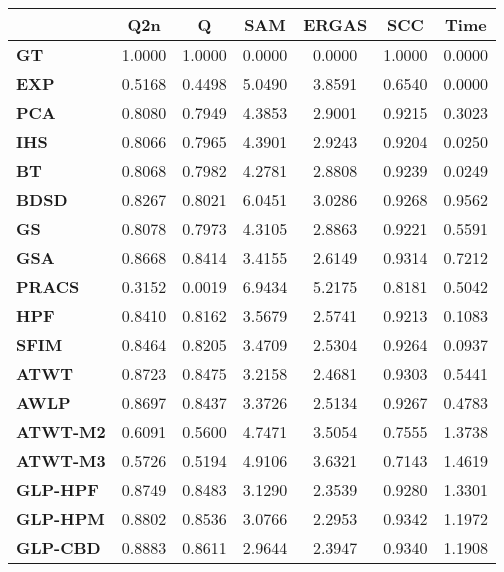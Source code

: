 \begin{tabular}{|l|c|c|c|c|c|c|}
\hline
&\textbf{Q2n}&\textbf{Q}&\textbf{SAM}&\textbf{ERGAS}&\textbf{SCC}&\textbf{Time}\\\hline
\textbf{GT}&1.0000&1.0000&0.0000&0.0000&1.0000&0.0000\\\hline
\textbf{EXP}&0.5168&0.4498&5.0490&3.8591&0.6540&0.0000\\\hline
\textbf{PCA}&0.8080&0.7949&4.3853&2.9001&0.9215&0.3023\\\hline
\textbf{IHS}&0.8066&0.7965&4.3901&2.9243&0.9204&0.0250\\\hline
\textbf{BT}&0.8068&0.7982&4.2781&2.8808&0.9239&0.0249\\\hline
\textbf{BDSD}&0.8267&0.8021&6.0451&3.0286&0.9268&0.9562\\\hline
\textbf{GS}&0.8078&0.7973&4.3105&2.8863&0.9221&0.5591\\\hline
\textbf{GSA}&0.8668&0.8414&3.4155&2.6149&0.9314&0.7212\\\hline
\textbf{PRACS}&0.3152&0.0019&6.9434&5.2175&0.8181&0.5042\\\hline
\textbf{HPF}&0.8410&0.8162&3.5679&2.5741&0.9213&0.1083\\\hline
\textbf{SFIM}&0.8464&0.8205&3.4709&2.5304&0.9264&0.0937\\\hline
\textbf{ATWT}&0.8723&0.8475&3.2158&2.4681&0.9303&0.5441\\\hline
\textbf{AWLP}&0.8697&0.8437&3.3726&2.5134&0.9267&0.4783\\\hline
\textbf{ATWT-M2}&0.6091&0.5600&4.7471&3.5054&0.7555&1.3738\\\hline
\textbf{ATWT-M3}&0.5726&0.5194&4.9106&3.6321&0.7143&1.4619\\\hline
\textbf{GLP-HPF}&0.8749&0.8483&3.1290&2.3539&0.9280&1.3301\\\hline
\textbf{GLP-HPM}&0.8802&0.8536&3.0766&2.2953&0.9342&1.1972\\\hline
\textbf{GLP-CBD}&0.8883&0.8611&2.9644&2.3947&0.9340&1.1908\\\hline
\end{tabular}

